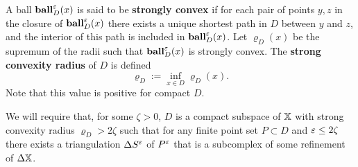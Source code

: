 A ball $\mathbf{ball}_D^\varepsilon(x)$ is said to be \textbf{strongly convex} if for each pair of points $y,z$ in the closure of $\mathbf{ball}_D^\varepsilon(x)$ there exists a unique shortest path in $D$ between $y$ and $z$, and the interior of this path is included in $\mathbf{ball}_D^\varepsilon(x)$.
Let $\varrho_D(x)$ be the supremum of the radii such that $\mathbf{ball}_D^\varepsilon(x)$ is strongly convex.
The \textbf{strong convexity radius} of $D$ is defined
\[ \varrho_D := \inf_{x\in D} \varrho_D(x).\]
Note that this value is positive for compact $D$.

We will require that, for some $\zeta > 0$, $D$ is a compact subspace of $\mathbb{X}$ with strong convexity radius $\varrho_D > 2\zeta$ such that for any finite point set $P\subset D$ and $\varepsilon \leq 2\zeta$ there exists a triangulation $\Delta S^\varepsilon$ of $P^\varepsilon$ that is a subcomplex of some refinement of $\Delta \mathbb{X}$.

\begin{lemma}
  
\end{lemma}
